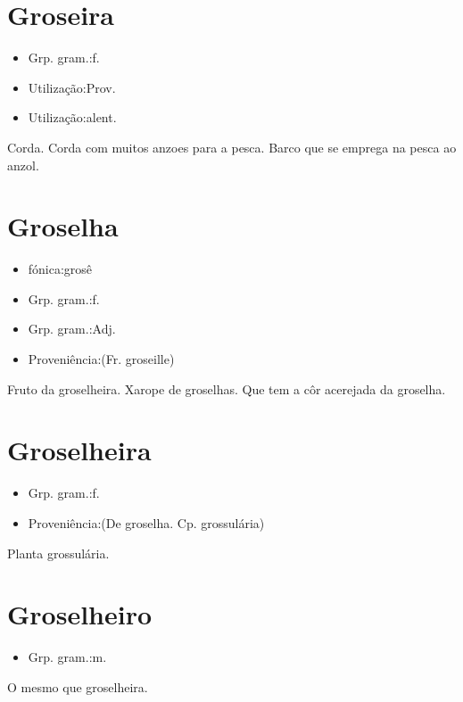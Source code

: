 \section{Groseira}
\begin{itemize}
\item {Grp. gram.:f.}
\end{itemize}
\begin{itemize}
\item {Utilização:Prov.}
\end{itemize}
\begin{itemize}
\item {Utilização:alent.}
\end{itemize}
Corda.
Corda com muitos anzoes para a pesca.
Barco que se emprega na pesca ao anzol.
\section{Groselha}
\begin{itemize}
\item {fónica:grosê}
\end{itemize}
\begin{itemize}
\item {Grp. gram.:f.}
\end{itemize}
\begin{itemize}
\item {Grp. gram.:Adj.}
\end{itemize}
\begin{itemize}
\item {Proveniência:(Fr. \textunderscore groseille\textunderscore )}
\end{itemize}
Fruto da groselheira.
Xarope de groselhas.
Que tem a côr acerejada da groselha.
\section{Groselheira}
\begin{itemize}
\item {Grp. gram.:f.}
\end{itemize}
\begin{itemize}
\item {Proveniência:(De \textunderscore groselha\textunderscore . Cp. \textunderscore grossulária\textunderscore )}
\end{itemize}
Planta grossulária.
\section{Groselheiro}
\begin{itemize}
\item {Grp. gram.:m.}
\end{itemize}
O mesmo que \textunderscore groselheira\textunderscore .
